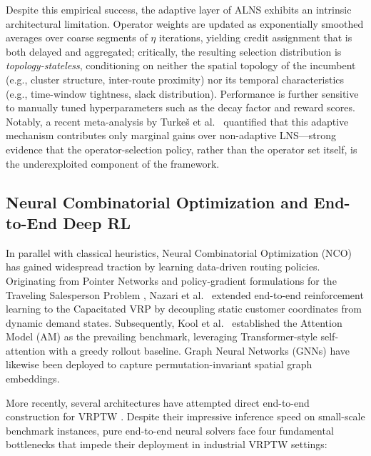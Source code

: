 \documentclass{ieeeaccess}
\begin{document}
Despite this empirical success, the adaptive layer of ALNS exhibits an
intrinsic architectural limitation. Operator weights are updated as
exponentially smoothed averages over coarse segments of $\eta$ iterations,
yielding credit assignment that is both delayed and aggregated; critically,
the resulting selection distribution is \emph{topology-stateless}, conditioning on
neither the spatial topology of the incumbent (e.g., cluster structure,
inter-route proximity) nor its temporal characteristics (e.g., time-window
tightness, slack distribution). Performance is further sensitive to manually
tuned hyperparameters such as the decay factor and reward scores. Notably, a
recent meta-analysis by Turke\v{s} et al.\ \cite{turkes2021meta} quantified
that this adaptive mechanism contributes only marginal gains over
non-adaptive LNS---strong evidence that the operator-selection policy, rather
than the operator set itself, is the underexploited component of the
framework.

\subsection{Neural Combinatorial Optimization and End-to-End Deep RL}
\label{sec:rw_nco}

In parallel with classical heuristics, Neural Combinatorial Optimization (NCO)
has gained widespread traction by learning data-driven routing policies.
Originating from Pointer Networks \cite{vinyals2015pointer} and policy-gradient
formulations for the Traveling Salesperson Problem \cite{bello2016neural},
Nazari et al.\ \cite{nazari2018reinforcement} extended end-to-end reinforcement
learning to the Capacitated VRP by decoupling static customer coordinates from
dynamic demand states. Subsequently, Kool et al.\ \cite{kool2019attention}
established the Attention Model (AM) as the prevailing benchmark, leveraging
Transformer-style self-attention with a greedy rollout baseline. Graph Neural
Networks (GNNs) \cite{khalil2017learning, joshi2019efficient} have likewise been
deployed to capture permutation-invariant spatial graph embeddings.

More recently, several architectures have attempted direct end-to-end
construction for VRPTW \cite{falkner2020learning, lin2021deep}. Despite their
impressive inference speed on small-scale benchmark instances, pure
end-to-end neural solvers face four fundamental bottlenecks that impede their
deployment in industrial VRPTW settings:
\end{document}
